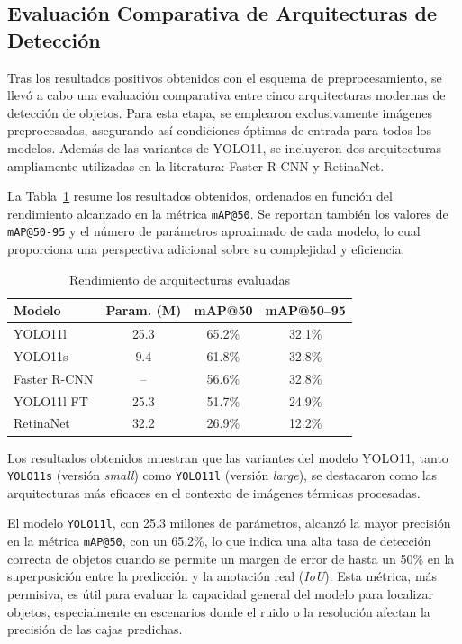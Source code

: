 \subsection{Evaluación Comparativa de Arquitecturas de Detección}

Tras los resultados positivos obtenidos con el esquema de preprocesamiento, se llevó a cabo una evaluación comparativa entre cinco arquitecturas modernas de detección de objetos. Para esta etapa, se emplearon exclusivamente imágenes preprocesadas, asegurando así condiciones óptimas de entrada para todos los modelos. Además de las variantes de YOLO11, se incluyeron dos arquitecturas ampliamente utilizadas en la literatura: Faster R-CNN y RetinaNet.

La Tabla~\ref{tab:resultados_modelos} resume los resultados obtenidos, ordenados en función del rendimiento alcanzado en la métrica \texttt{mAP@50}. Se reportan también los valores de \texttt{mAP@50-95} y el número de parámetros aproximado de cada modelo, lo cual proporciona una perspectiva adicional sobre su complejidad y eficiencia.

\begin{table}[h]
\centering
\small %
\caption{Rendimiento de arquitecturas evaluadas}
\label{tab:resultados_modelos}
\begin{tabular}{|l|c|c|c|}
\hline
\textbf{Modelo} & \textbf{Param. (M)} & \textbf{mAP@50} & \textbf{mAP@50--95} \\
\hline
YOLO11l & 25.3 & 65.2\% & 32.1\% \\
YOLO11s & 9.4 & 61.8\% & 32.8\% \\
Faster R-CNN & -- & 56.6\% & 32.8\% \\
YOLO11l FT & 25.3 & 51.7\% & 24.9\% \\
RetinaNet & 32.2 & 26.9\% & 12.2\% \\
\hline
\end{tabular}
\end{table}

Los resultados obtenidos muestran que las variantes del modelo YOLO11, tanto \texttt{YOLO11s} (versión \textit{small}) como \texttt{YOLO11l} (versión \textit{large}), se destacaron como las arquitecturas más eficaces en el contexto de imágenes térmicas procesadas. 

El modelo \texttt{YOLO11l}, con 25.3 millones de parámetros, alcanzó la mayor precisión en la métrica \texttt{mAP@50}, con un 65.2\%, lo que indica una alta tasa de detección correcta de objetos cuando se permite un margen de error de hasta un 50\% en la superposición entre la predicción y la anotación real (\textit{IoU}). Esta métrica, más permisiva, es útil para evaluar la capacidad general del modelo para localizar objetos, especialmente en escenarios donde el ruido o la resolución afectan la precisión de las cajas predichas.

